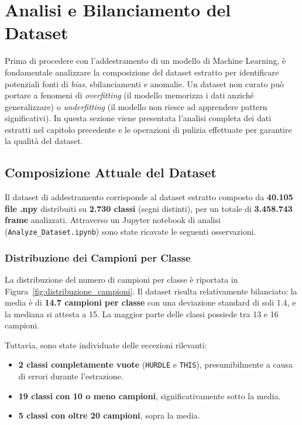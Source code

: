 
\section{Analisi e Bilanciamento del Dataset}

Prima di procedere con l'addestramento di un modello di Machine Learning, è fondamentale analizzare la composizione del dataset estratto per identificare potenziali fonti di \textit{bias}, sbilanciamenti e anomalie. Un dataset non curato può portare a fenomeni di \textit{overfitting} (il modello memorizza i dati anziché generalizzare) o \textit{underfitting} (il modello non riesce ad apprendere pattern significativi). In questa sezione viene presentata l'analisi completa dei dati estratti nel capitolo precedente e le operazioni di pulizia effettuate per garantire la qualità del dataset.

\subsection{Composizione Attuale del Dataset}

Il dataset di addestramento corrisponde al dataset estratto composto da \textbf{40.105 file .npy} distribuiti su \textbf{2.730 classi} (segni distinti), per un totale di \textbf{3.458.743 frame} analizzati. Attraverso un Jupyter notebook di analisi (\texttt{Analyze\_Dataset.ipynb}) sono state ricavate le seguenti osservazioni.

\subsubsection{Distribuzione dei Campioni per Classe}

La distribuzione del numero di campioni per classe è riportata in Figura~\ref{fig:distribuzione_campioni}. Il dataset risulta relativamente bilanciato: la media è di \textbf{14.7 campioni per classe} con una deviazione standard di soli 1.4, e la mediana si attesta a 15. La maggior parte delle classi possiede tra 13 e 16 campioni.

Tuttavia, sono state individuate delle eccezioni rilevanti:
\begin{itemize}
    \item \textbf{2 classi completamente vuote} (\texttt{HURDLE} e \texttt{THIS}), presumibilmente a causa di errori durante l'estrazione.
    \item \textbf{19 classi con 10 o meno campioni}, significativamente sotto la media.
    \item \textbf{5 classi con oltre 20 campioni}, sopra la media.
\end{itemize}

